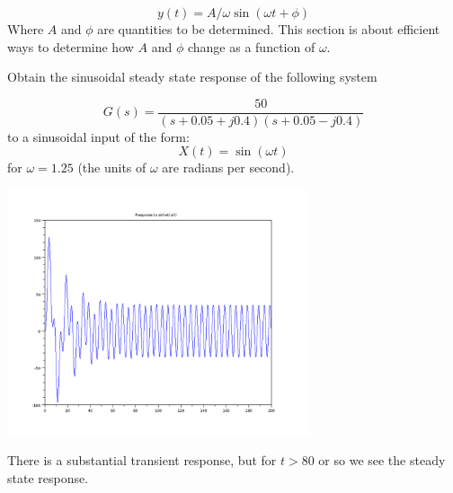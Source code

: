 \[
y(t) = A/\omega \sin(\omega t + \phi)
\]
Where $A$ and $\phi$ are quantities to be determined.   This section is about efficient ways to determine how $A$ and $\phi$ change as a function of $\omega$.


\begin{ExampleSmall}
Obtain the sinusoidal steady state response of  the following system

\[
G(s) = \frac{50}{(s+0.05+j0.4)(s+0.05-j0.4)}
\]
to a sinusoidal input of the form:
\[
X(t) = \sin(\omega t)
\]
for $\omega = 1.25$ (the units of $\omega$ are radians per second).


\includegraphics[width=3.5in]{figs05/sinusoid_contina.png}

There is a substantial transient response, but for $t>80$ or so we see the steady state response.

\end{ExampleSmall}





